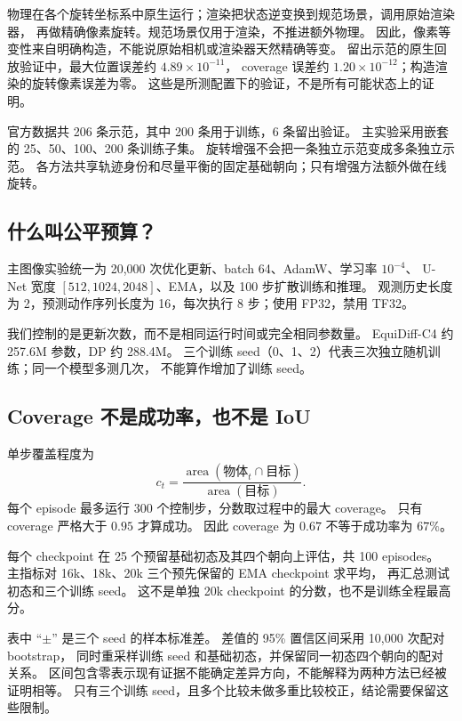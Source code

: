 物理在各个旋转坐标系中原生运行；渲染把状态逆变换到规范场景，调用原始渲染器，
再做精确像素旋转。规范场景仅用于渲染，不推进额外物理。
因此，像素等变性来自明确构造，不能说原始相机或渲染器天然精确等变。
留出示范的原生回放验证中，最大位置误差约 $4.89\times10^{-11}$，
coverage 误差约 $1.20\times10^{-12}$；构造渲染的旋转像素误差为零。
这些是所测配置下的验证，不是所有可能状态上的证明。

官方数据共 206 条示范，其中 200 条用于训练，6 条留出验证。
主实验采用嵌套的 25、50、100、200 条训练子集。
旋转增强不会把一条独立示范变成多条独立示范。
各方法共享轨迹身份和尽量平衡的固定基础朝向；只有增强方法额外做在线旋转。

\subsection{什么叫公平预算？}
主图像实验统一为 20,000 次优化更新、batch 64、AdamW、学习率 $10^{-4}$、
U-Net 宽度 $[512,1024,2048]$、EMA，以及 100 步扩散训练和推理。
观测历史长度为 2，预测动作序列长度为 16，每次执行 8 步；使用 FP32，禁用 TF32。

我们控制的是更新次数，而不是相同运行时间或完全相同参数量。
EquiDiff-C4 约 257.6M 参数，DP 约 288.4M。
三个训练 seed（0、1、2）代表三次独立随机训练；同一个模型多测几次，
不能算作增加了训练 seed。

\subsection{Coverage 不是成功率，也不是 IoU}
单步覆盖程度为
\begin{equation}
c_t=\frac{\operatorname{area}(\text{物体}_t\cap\text{目标})}
{\operatorname{area}(\text{目标})}.
\label{eqstudy:zh:coverage}
\end{equation}
每个 episode 最多运行 300 个控制步，分数取过程中的最大 coverage。
只有 coverage 严格大于 $0.95$ 才算成功。
因此 coverage 为 $0.67$ 不等于成功率为 $67\%$。

每个 checkpoint 在 25 个预留基础初态及其四个朝向上评估，共 100 episodes。
主指标对 16k、18k、20k 三个预先保留的 EMA checkpoint 求平均，
再汇总测试初态和三个训练 seed。
这不是单独 20k checkpoint 的分数，也不是训练全程最高分。

表中 ``$\pm$'' 是三个 seed 的样本标准差。
差值的 95\% 置信区间采用 10,000 次配对 bootstrap，
同时重采样训练 seed 和基础初态，并保留同一初态四个朝向的配对关系。
区间包含零表示现有证据不能确定差异方向，不能解释为两种方法已经被证明相等。
只有三个训练 seed，且多个比较未做多重比较校正，结论需要保留这些限制。

